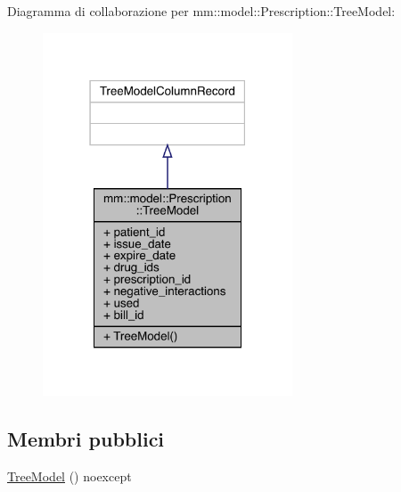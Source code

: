 Diagramma di collaborazione per mm\+:\+:model\+:\+:Prescription\+:\+:Tree\+Model\+:\nopagebreak
\begin{figure}[H]
\begin{center}
\leavevmode
\includegraphics[width=210pt]{de/d92/structmm_1_1model_1_1_prescription_1_1_tree_model__coll__graph}
\end{center}
\end{figure}
\subsection*{Membri pubblici}
\begin{DoxyCompactItemize}
\item 
\hyperlink{structmm_1_1model_1_1_prescription_1_1_tree_model_a3b6f84fdc2b7a9f83e4c9ec7594a534d}{Tree\+Model} () noexcept
\end{DoxyCompactItemize}
